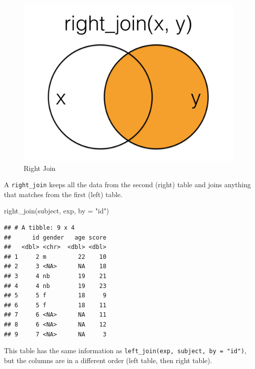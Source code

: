 \documentclass[
  oneside]{book}
\newenvironment{Shaded}{\begin{snugshade}}{\end{snugshade}}
\newcommand{\AttributeTok}[1]{\textcolor[rgb]{0.77,0.63,0.00}{#1}}
\newcommand{\FunctionTok}[1]{\textcolor[rgb]{0.00,0.00,0.00}{#1}}
\newcommand{\NormalTok}[1]{#1}
\newcommand{\StringTok}[1]{\textcolor[rgb]{0.31,0.60,0.02}{#1}}
\begin{document}
\begin{figure}

{\centering \includegraphics[width=1\linewidth]{images/joins/right_join} 

}

\caption{Right Join}\label{fig:img-right-join}
\end{figure}

A \texttt{right\_join} keeps all the data from the second (right) table and joins anything that matches from the first (left) table.

\begin{Shaded}
\begin{Highlighting}[]
\FunctionTok{right\_join}\NormalTok{(subject, exp, }\AttributeTok{by =} \StringTok{"id"}\NormalTok{)}
\end{Highlighting}
\end{Shaded}

\begin{verbatim}
## # A tibble: 9 x 4
##      id gender   age score
##   <dbl> <chr>  <dbl> <dbl>
## 1     2 m         22    10
## 2     3 <NA>      NA    18
## 3     4 nb        19    21
## 4     4 nb        19    23
## 5     5 f         18     9
## 6     5 f         18    11
## 7     6 <NA>      NA    11
## 8     6 <NA>      NA    12
## 9     7 <NA>      NA     3
\end{verbatim}

\begin{info}
This table has the same information as \texttt{left\_join(exp,\ subject,\ by\ =\ "id")}, but the columns are in a different order (left table, then right table).

\end{info}
\end{document}
